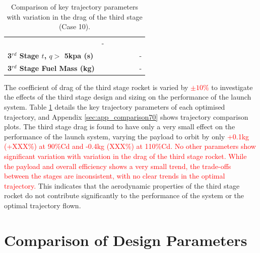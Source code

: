\begin{table}[ht]
\begin{tabular}{l c c c c c c}
			& -
			\\
			\textbf{3$^{rd}$ Stage $t$, $q >$ 5kpa (s)}
			& \thirdqOverFiveCdThreeNinetyNoReturn
			& \thirdqOverFiveCdThreeNinetyFiveNoReturn
			& \thirdqOverFiveCdThreeStandardNoReturn
			& \thirdqOverFiveCdThreeOneOneHundredFiveNoReturn
			& \thirdqOverFiveCdThreeOneHundredTenNoReturn
			& -
			\\
			\textbf{3$^{rd}$ Stage Fuel Mass (kg)}
			& \thirdmFuelCdThreeNinetyNoReturn
			& \thirdmFuelCdThreeNinetyFiveNoReturn
			& \thirdmFuelCdThreeStandardNoReturn
			& \thirdmFuelCdThreeOneOneHundredFiveNoReturn
			& \thirdmFuelCdThreeOneHundredTenNoReturn
			& -
			\\
			\hline 
		\end{tabular} 
	\caption{Comparison of key trajectory parameters with variation in the drag of the third stage (Case 10).}
	\label{tab:comparison70}
	
\end{table}

The coefficient of drag of the third stage rocket is varied by \textcolor{red}{$\pm10\%$} to investigate the effects of the third stage design and sizing on the performance of the launch system. Table \ref{tab:comparison70} details the key trajectory parameters of each optimised trajectory, and Appendix \ref{sec:app_comparison70} shows trajectory comparison plots. The third stage drag is found to have only a very small effect on the performance of the launch system, varying the payload to orbit by only \textcolor{red}{+0.1kg (+XXX\%) at 90\%Cd and -0.4kg (XXX\%) at 110\%Cd. No other parameters show significant variation with variation in the drag of the third stage rocket. While the payload and overall efficiency shows a very small trend, the trade-offs between the stages are inconsistent, with no clear trends in the optimal trajectory.} This indicates that the aerodynamic properties of the third stage rocket do not contribute significantly to the performance of the system or the optimal trajectory flown. 



\section{Comparison of Design Parameters}\label{sec:comparisonNoReturn}


